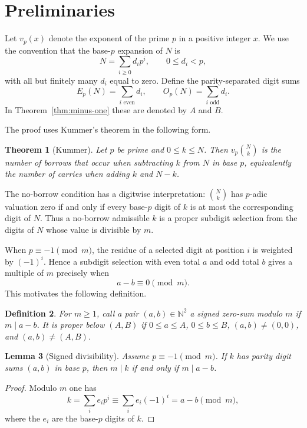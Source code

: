 \documentclass[11pt]{article}
\newtheorem{theorem}{Theorem}[section]
\newtheorem{lemma}[theorem]{Lemma}
\newtheorem{definition}[theorem]{Definition}
\newcommand{\N}{\mathbb{N}}
\begin{document}
\section{Preliminaries}\label{sec:prelim}

Let $v_p(x)$ denote the exponent of the prime $p$ in a positive integer $x$.
We use the convention that the base-$p$ expansion of $N$ is
\[
  N=\sum_{i\geq 0} d_i p^i,
  \qquad 0\leq d_i<p,
\]
with all but finitely many $d_i$ equal to zero.  Define the parity-separated
digit sums
\[
  E_p(N)=\sum_{i\text{ even}}d_i,
  \qquad
  O_p(N)=\sum_{i\text{ odd}}d_i.
\]
In Theorem~\ref{thm:minus-one} these are denoted by $A$ and $B$.

The proof uses Kummer's theorem in the following form.

\begin{theorem}[Kummer]\label{thm:kummer}
Let $p$ be prime and $0\leq k\leq N$.  Then
$v_p\binom Nk$ is the number of borrows that occur when subtracting $k$ from
$N$ in base $p$, equivalently the number of carries when adding $k$ and $N-k$.
\end{theorem}

The no-borrow condition has a digitwise interpretation: $\binom Nk$ has
$p$-adic valuation zero if and only if every base-$p$ digit of $k$ is at most
the corresponding digit of $N$.  Thus a no-borrow admissible $k$ is a proper
subdigit selection from the digits of $N$ whose value is divisible by $m$.

When $p\equiv -1\pmod m$, the residue of a selected digit at position $i$ is
weighted by $(-1)^i$.  Hence a subdigit selection with even total $a$ and odd
total $b$ gives a multiple of $m$ precisely when
\[
  a-b\equiv 0\pmod m .
\]
This motivates the following definition.

\begin{definition}
For $m\geq 1$, call a pair $(a,b)\in\N^2$ a signed zero-sum modulo $m$ if
$m\mid a-b$.  It is proper below $(A,B)$ if
$0\leq a\leq A$, $0\leq b\leq B$, $(a,b)\ne(0,0)$, and $(a,b)\ne(A,B)$.
\end{definition}

\begin{lemma}[Signed divisibility]\label{lem:signed-div}
Assume $p\equiv -1\pmod m$.  If $k$ has parity digit sums $(a,b)$ in base $p$,
then $m\mid k$ if and only if $m\mid a-b$.
\end{lemma}

\begin{proof}
Modulo $m$ one has
\[
  k=\sum_i e_i p^i\equiv \sum_i e_i(-1)^i = a-b \pmod m,
\]
where the $e_i$ are the base-$p$ digits of $k$.
\end{proof}
\end{document}
